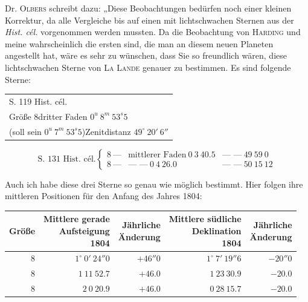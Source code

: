 Dr. \textsc{Olbers} schreibt dazu: „Diese Beobachtungen bedürfen noch einer kleinen Korrektur, da alle Vergleiche bis auf einen mit lichtschwachen Sternen aus der \textit{Hist. cél.} vorgenommen werden mussten. Da die Beobachtung von \textsc{Harding} und meine wahrscheinlich die ersten sind, die man an diesem neuen Planeten angestellt hat, wäre es sehr zu wünschen, dass Sie so freundlich wären, diese lichtschwachen Sterne von \textsc{La Lande} genauer zu bestimmen. Es sind folgende Sterne:

\begin{center}\fontsize{9}{11}\selectfont
\begin{tabular}{l}
S. 119 Hist. cél.\\
Größe $8$\quad dritter Faden $0^u\ 8^m\ 53^s5$\\
\quad (soll sein $0^u\ 7^m\ 53^s5$)\quad Zenitdistanz $49^\circ\ 20'\ 6''$
\end{tabular}
\[
\text{S. 131 Hist. cél.}\left\{\begin{array}{lll}
8\ \text{—}&\text{mittlerer Faden}\ 0\ 3\ 40.5&\text{— —}\ 49\ 59\ 0\\
8\ \text{—}&\text{— —}\ 0\ 4\ 26.0&\text{— —}\ 50\ 15\ 12
\end{array}\right.
\]
\end{center}
\par
{}%
\indent Auch ich habe diese drei Sterne so genau wie möglich bestimmt. Hier folgen ihre mittleren Positionen für den Anfang des Jahres 1804:

\begin{center}
\begingroup\fontsize{8}{10}\selectfont\setlength{\tabcolsep}{3pt}\renewcommand{\arraystretch}{1.12}
\begin{tabular}{r|r|r|r|r}
Größe & \shortstack{Mittlere gerade\\Aufsteigung\\1804} & \shortstack{Jährliche\\Änderung} & \shortstack{Mittlere südliche\\Deklination\\1804} & \shortstack{Jährliche\\Änderung} \\ \hline
$8$ & $1^\circ\ 0'\ 24''0$ & $+46''0$ & $1^\circ\ 7'\ 19''6$ & $-20''0$ \\
$8$ & $1\ 11\ 52.7$ & $+46.0$ & $1\ 23\ 30.9$ & $-20.0$ \\
$8$ & $2\ 0\ 20.9$ & $+46.0$ & $0\ 28\ 15.7$ & $-20.0$ \\
\end{tabular}\endgroup
\end{center}

